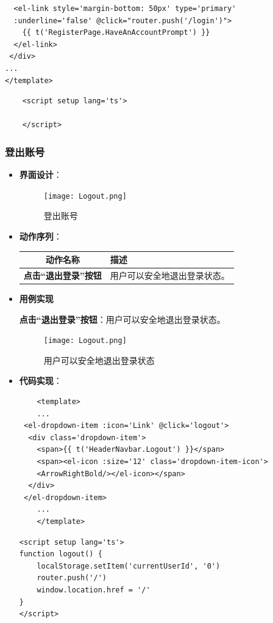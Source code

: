\begin{itemize}
\begin{verbatim}
  <el-link style='margin-bottom: 50px' type='primary' 
  :underline='false' @click="router.push('/login')">
    {{ t('RegisterPage.HaveAnAccountPrompt') }}
  </el-link>
 </div>
...
</template>
	\end{verbatim}
	
	\begin{verbatim}
	<script setup lang='ts'>
	
	</script>
	\end{verbatim}

\end{itemize}

\subsubsection{登出账号}

\begin{itemize}
	\item \textbf{界面设计}：
	\begin{figure}[H]
		\centering
		\texttt{[image: Logout.png]}
		\caption{登出账号}
	\end{figure}
	\item \textbf{动作序列}：
	\begin{table}[H]
		\centering
		\renewcommand\arraystretch{1.5}
		\begin{tabular}{|c|>{\raggedright\arraybackslash}p{10cm}|}
			\hline
			\textbf{动作名称} & \textbf{描述} \\ \hline
			\textbf{点击“退出登录”按钮} & 用户可以安全地退出登录状态。\\ \hline
		\end{tabular}
	\end{table}
	
	\item \textbf{用例实现}

	\textbf{点击“退出登录”按钮}：用户可以安全地退出登录状态。

	\begin{figure}[H]
		\centering
		\texttt{[image: Logout.png]}
		\caption{用户可以安全地退出登录状态}
	\end{figure}

	\item \textbf{代码实现}：
	\begin{verbatim}
	<template>
	...
 <el-dropdown-item :icon='Link' @click='logout'>
  <div class='dropdown-item'>
    <span>{{ t('HeaderNavbar.Logout') }}</span>
    <span><el-icon :size='12' class='dropdown-item-icon'>
    <ArrowRightBold/></el-icon></span>
  </div>
 </el-dropdown-item>
	...
	</template>
	\end{verbatim}
	
    \begin{verbatim}
<script setup lang='ts'>
function logout() {
  	localStorage.setItem('currentUserId', '0')
  	router.push('/')
  	window.location.href = '/'
}
</script>
    \end{verbatim}
\end{itemize}

